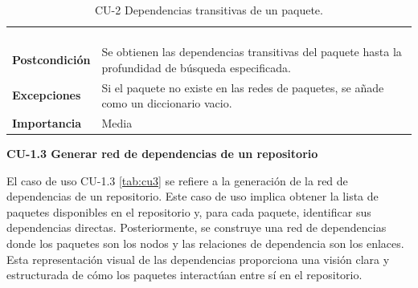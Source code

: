 \begin{table}[p]
\begin{tabularx}{\linewidth}{ p{} p{} }
\begin{enumerate}
		\end{enumerate}              \\
		\textbf{Postcondición}        & Se obtienen las dependencias transitivas del paquete hasta la profundidad de búsqueda especificada.    \\
		\textbf{Excepciones}          & Si el paquete no existe en las redes de paquetes, se añade como un diccionario vacio.                  \\
		\textbf{Importancia}          & Media                                                                                                  \\
		\bottomrule
	\end{tabularx}
	\caption{CU-2 Dependencias transitivas de un paquete.}
	\label{tab:cu2}
\end{table}


\textbf{CU-1.3 Generar red de dependencias de un repositorio}

El caso de uso CU-1.3 \ref{tab:cu3} se refiere a la generación de la red de dependencias de un repositorio. Este caso de uso 
implica obtener la lista de paquetes disponibles en el repositorio y, para cada paquete, identificar sus 
dependencias directas. Posteriormente, se construye una red de dependencias donde los paquetes son los nodos 
y las relaciones de dependencia son los enlaces. Esta representación visual de las dependencias proporciona 
una visión clara y estructurada de cómo los paquetes interactúan entre sí en el repositorio.

